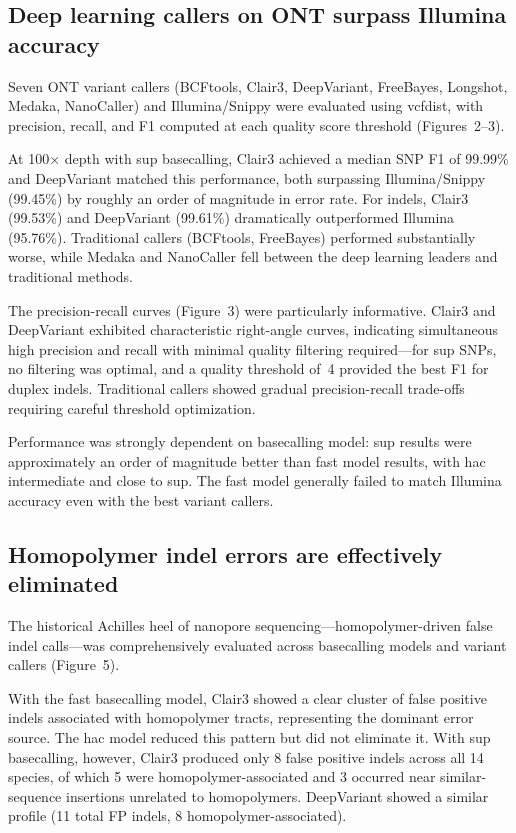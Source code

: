 \documentclass[11pt]{article}
\begin{document}
\subsection{Deep learning callers on ONT surpass Illumina accuracy}

Seven ONT variant callers (BCFtools, Clair3, DeepVariant, FreeBayes, Longshot, Medaka, NanoCaller) and Illumina/Snippy were evaluated using vcfdist, with precision, recall, and F1 computed at each quality score threshold (Figures~2--3).

At 100$\times$ depth with sup basecalling, Clair3 achieved a median SNP F1 of 99.99\% and DeepVariant matched this performance, both surpassing Illumina/Snippy (99.45\%) by roughly an order of magnitude in error rate. For indels, Clair3 (99.53\%) and DeepVariant (99.61\%) dramatically outperformed Illumina (95.76\%). Traditional callers (BCFtools, FreeBayes) performed substantially worse, while Medaka and NanoCaller fell between the deep learning leaders and traditional methods.

The precision-recall curves (Figure~3) were particularly informative. Clair3 and DeepVariant exhibited characteristic right-angle curves, indicating simultaneous high precision and recall with minimal quality filtering required---for sup SNPs, no filtering was optimal, and a quality threshold of~4 provided the best F1 for duplex indels. Traditional callers showed gradual precision-recall trade-offs requiring careful threshold optimization.

Performance was strongly dependent on basecalling model: sup results were approximately an order of magnitude better than fast model results, with hac intermediate and close to sup. The fast model generally failed to match Illumina accuracy even with the best variant callers.

\subsection{Homopolymer indel errors are effectively eliminated}

The historical Achilles heel of nanopore sequencing---homopolymer-driven false indel calls---was comprehensively evaluated across basecalling models and variant callers (Figure~5).

With the fast basecalling model, Clair3 showed a clear cluster of false positive indels associated with homopolymer tracts, representing the dominant error source. The hac model reduced this pattern but did not eliminate it. With sup basecalling, however, Clair3 produced only 8 false positive indels across all 14 species, of which 5 were homopolymer-associated and 3 occurred near similar-sequence insertions unrelated to homopolymers. DeepVariant showed a similar profile (11 total FP indels, 8 homopolymer-associated).
\end{document}
